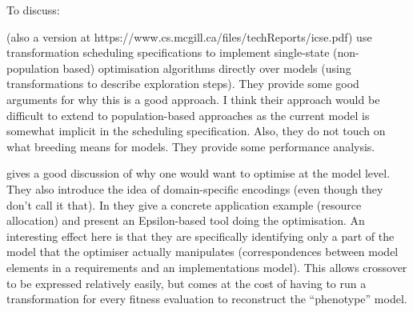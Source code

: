 		\begin{draftlist}
			To discuss:
			\item \cite{Denil+14} (also a version at https://www.cs.mcgill.ca/files/techReports/icse.pdf) use transformation scheduling specifications to implement 
						single-state (non-population based) optimisation algorithms directly over models 
						(using transformations to describe exploration steps). They provide some good arguments for why this is a good approach. I think their approach would be
						difficult to extend to population-based approaches as the current model is somewhat implicit in the scheduling specification. Also, they do not touch on
						what breeding means for models. They provide some performance analysis.
						
			\item \cite{BurtonPoulding13} gives a good discussion of why one would want to optimise at the model level. They also introduce the idea of domain-specific
						encodings (even though they don't call it that). In \cite{Burton+12} they give a concrete application example (resource allocation) and present an 
						Epsilon-based tool doing the optimisation. An interesting effect here is that they are specifically identifying only a part of the model that the 
						optimiser actually manipulates (correspondences between model elements in a requirements and an implementations model). This allows crossover to be
						expressed relatively easily, but comes at the cost of having to run a transformation for every fitness evaluation to reconstruct the ``phenotype'' model.
		\end{draftlist}